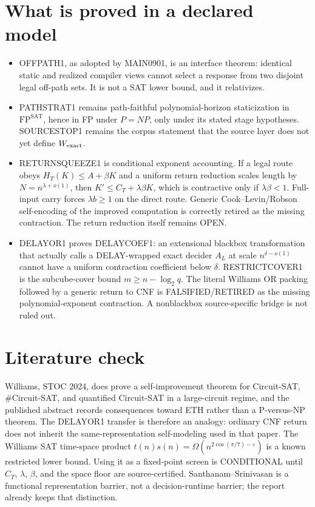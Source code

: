 \documentclass[11pt]{article}
\begin{document}
\section*{What is proved in a declared model}
\begin{itemize}
\item OFFPATH1, as adopted by MAIN0901, is an interface theorem: identical static and
realized compiler views cannot select a response from two disjoint legal off-path sets.
It is not a SAT lower bound, and it relativizes.
\item PATHSTRAT1 remains path-faithful polynomial-horizon staticization in
\(\mathrm{FP}^{\mathrm{SAT}}\), hence in FP under \(P=NP\), only under its stated
stage hypotheses. SOURCESTOP1 remains the corpus statement that the source layer does
not yet define \(W_{\rm exact}\).
\item RETURNSQUEEZE1 is conditional exponent accounting. If a legal route obeys
\(H_T(K)\le A+\beta K\) and a uniform return reduction scales length by
\(N=n^{\lambda+o(1)}\), then \(K'\le C_T+\lambda\beta K\), which is contractive only
if \(\lambda\beta<1\). Full-input carry forces \(\lambda b\ge 1\) on the direct route.
Generic Cook--Levin/Robson self-encoding of the improved computation is correctly
retired as the missing contraction. The return reduction itself remains OPEN.
\item DELAYOR1 proves DELAYCOEF1: an extensional blackbox transformation that actually
calls a DELAY-wrapped exact decider \(A_L\) at scale \(n^{\delta-o(1)}\) cannot have a
uniform contraction coefficient below \(\delta\). RESTRICTCOVER1 is the subcube-cover
bound \(m\ge n-\log_2 q\). The literal Williams OR packing followed by a generic return
to CNF is FALSIFIED/RETIRED as the missing polynomial-exponent contraction. A
nonblackbox source-specific bridge is not ruled out.
\end{itemize}

\section*{Literature check}
Williams, STOC 2024, does prove a self-improvement theorem for Circuit-SAT,
\#Circuit-SAT, and quantified Circuit-SAT in a large-circuit regime, and the published
abstract records consequences toward ETH rather than a P-versus-NP theorem. The
DELAYOR1 transfer is therefore an analogy: ordinary CNF return does not inherit the
same-representation self-modeling used in that paper. The Williams SAT time-space
product \(t(n)s(n)=\Omega(n^{2\cos(\pi/7)-\varepsilon})\) is a known restricted lower
bound. Using it as a fixed-point screen is CONDITIONAL until \(C_T\), \(\lambda\),
\(\beta\), and the space floor are source-certified. Santhanam--Srinivasan is a
functional representation barrier, not a decision-runtime barrier; the report already
keeps that distinction.
\end{document}
